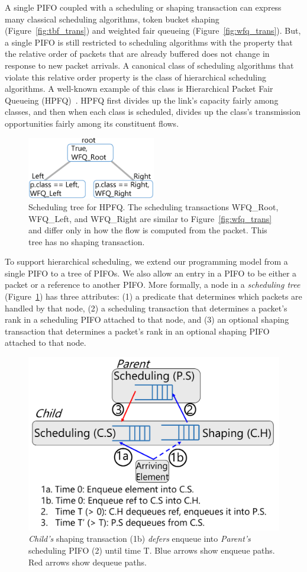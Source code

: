A single PIFO coupled with a scheduling or shaping transaction can express many
classical scheduling algorithms, \eg token bucket shaping
(Figure~\ref{fig:tbf_trans}) and weighted fair queueing
(Figure~\ref{fig:wfq_trans}). But, a single PIFO is still restricted to
scheduling algorithms with the property that the relative order of packets that
are already buffered does not change in response to new packet arrivals. A
canonical class of scheduling algorithms that violate this relative order
property is the class of hierarchical scheduling algorithms. A well-known
example of this class is Hierarchical Packet Fair Queueing (HPFQ)~\cite{hpfq}.
HPFQ first divides up the link's capacity fairly among classes, and then when
each class is scheduled, divides up the class's transmission opportunities
fairly among its constituent flows.

\begin{figure}[!t]
\centering
\includegraphics[width=0.5\textwidth]{pifo_hpfq_program.pdf}
\caption{Scheduling tree for HPFQ. The scheduling transactions WFQ\_Root,
WFQ\_Left, and WFQ\_Right are similar to Figure~\ref{fig:wfq_trans} and differ
only in how the flow is computed from the packet. This tree has no shaping
transaction.}
\label{fig:scheduling_tree}
\end{figure}

To support hierarchical scheduling, we extend our programming model from a
single PIFO to a tree of PIFOs. We also allow an entry in a PIFO to be either a
packet or a reference to another PIFO. More formally, a node in a {\em
scheduling tree} (Figure~\ref{fig:scheduling_tree}) has three attributes: (1) a
predicate that determines which packets are handled by that node, (2) a
scheduling transaction that determines a packet's rank in a scheduling PIFO
attached to that node, and (3) an optional shaping transaction that determines
a packet's rank in an optional shaping PIFO attached to that node.

\begin{figure}[!t]
  \centering
  \includegraphics[width=0.6\columnwidth]{pifo_shaping_semantics.pdf}
  \caption{\textit{Child's} shaping transaction (1b) {\em defers} enqueue
  into \textit{Parent's} scheduling PIFO (2) until time T.  Blue arrows
  show enqueue paths. Red arrows show dequeue paths.  }
  \label{fig:shaping_timing}
\end{figure}


